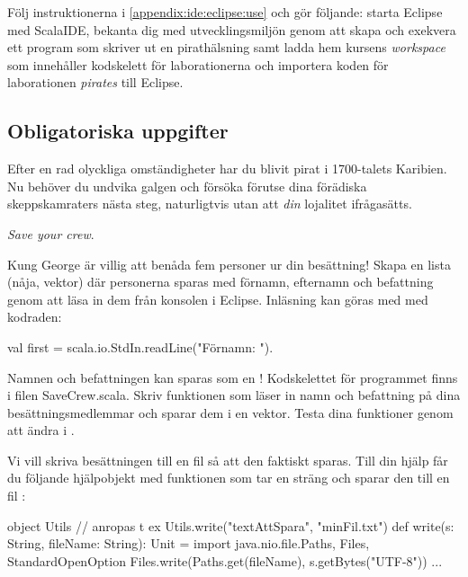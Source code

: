 Följ instruktionerna i \ref{appendix:ide:eclipse:use} och gör följande: starta Eclipse med ScalaIDE, bekanta dig med utvecklingsmiljön genom att skapa och exekvera ett program som skriver ut en pirathälsning samt ladda hem kursens \emph{workspace} som innehåller kodskelett för laborationerna och importera koden för laborationen \emph{pirates} till Eclipse. 



\subsection{Obligatoriska uppgifter}
Efter en rad olyckliga omständigheter har du blivit pirat i 1700-talets Karibien. Nu beh{\"o}ver du undvika galgen och f{\"o}rs{\"o}ka f{\"o}rutse dina f{\"o}r{\"a}diska skeppskamraters n{\"a}sta steg, naturligtvis utan att \emph{din} lojalitet ifrågasätts. 

\Task \emph{Save your crew}. 

\Subtask Kung George {\"a}r villig att ben{\aa}da fem personer ur din bes{\"a}ttning! Skapa en lista (nåja, vektor) d{\"a}r personerna sparas med f{\"o}rnamn, efternamn och befattning genom att l{\"a}sa in dem fr{\aa}n konsolen i Eclipse. Inl{\"a}sning kan g{\"o}ras med  med kodraden: 
\begin{Code}
val first = scala.io.StdIn.readLine("Förnamn: "). 
\end{Code}
Namnen och befattningen kan sparas som en ! Kodskelettet för programmet finns i filen SaveCrew.scala. Skriv  funktionen  som läser in namn och befattning på dina besättningsmedlemmar och sparar dem i en vektor. Testa dina funktioner genom att ändra i .

\Subtask Vi vill skriva besättningen till en fil så att den faktiskt sparas. Till din hjälp får du följande hjälpobjekt  med funktionen  som tar en sträng  och sparar den till en fil :
\begin{CodeSmall}
object Utils{
   // anropas t ex Utils.write("textAttSpara", "minFil.txt")
  def write(s: String, fileName: String): Unit = {
			import java.nio.file.{Paths, Files, StandardOpenOption}
			Files.write(Paths.get(fileName), s.getBytes("UTF-8"))
  } 
  ...
}
\end{CodeSmall}

